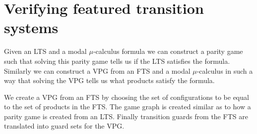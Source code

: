 \section{Verifying featured transition systems}
Given an LTS and a modal $\mu$-calculus formula we can construct a parity game such that solving this parity game tells us if the LTS satisfies the formula. Similarly we can construct a VPG from an FTS and a modal $\mu$-calculus in such a way that solving the VPG tells us what products satisfy the formula.

We create a VPG from an FTS by choosing the set of configurations to be equal to the set of products in the FTS. The game graph is created similar as to how a parity game is created from an LTS. Finally transition guards from the FTS are translated into guard sets for the VPG.

